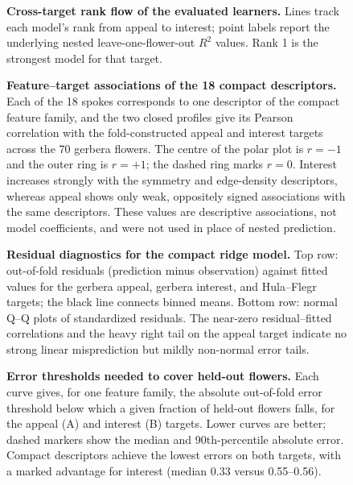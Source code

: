 \documentclass[10pt,letterpaper]{article}
\begin{document}
\begin{figure}[!h]
\caption{\textbf{Cross-target rank flow of the evaluated learners.} Lines track each model's rank from appeal to interest; point labels report the underlying nested leave-one-flower-out $R^2$ values. Rank 1 is the strongest model for that target.}
\label{fig:r2}
\end{figure}

\begin{figure}[!h]
\caption{\textbf{Feature--target associations of the 18 compact descriptors.}
Each of the 18 spokes corresponds to one descriptor of the compact feature
family, and the two closed profiles give its Pearson correlation with the
fold-constructed appeal and interest targets across the 70 gerbera flowers.
The centre of the polar plot is $r=-1$ and the outer ring is $r=+1$; the
dashed ring marks $r=0$. Interest increases strongly with the symmetry and
edge-density descriptors, whereas appeal shows only weak, oppositely signed
associations with the same descriptors. These values are descriptive
associations, not model coefficients, and were not used in place of nested
prediction.}
\label{fig:feature}
\end{figure}

\begin{figure}[!h]
\caption{\textbf{Residual diagnostics for the compact ridge model.}
Top row: out-of-fold residuals (prediction minus observation) against fitted
values for the gerbera appeal, gerbera interest, and Hula--Flegr targets;
the black line connects binned means. Bottom row: normal Q--Q plots of
standardized residuals. The near-zero residual--fitted correlations and the
heavy right tail on the appeal target indicate no strong linear
misprediction but mildly non-normal error tails.}
\label{fig:residuals}
\end{figure}




\begin{figure}[!h]
\caption{\textbf{Error thresholds needed to cover held-out flowers.}
Each curve gives, for one feature family, the absolute out-of-fold error
threshold below which a given fraction of held-out flowers falls, for the
appeal (A) and interest (B) targets. Lower curves are better; dashed markers
show the median and 90th-percentile absolute error. Compact descriptors
achieve the lowest errors on both targets, with a marked advantage for
interest (median 0.33 versus 0.55--0.56).}
\label{fig:errors}
\end{figure}
\end{document}
